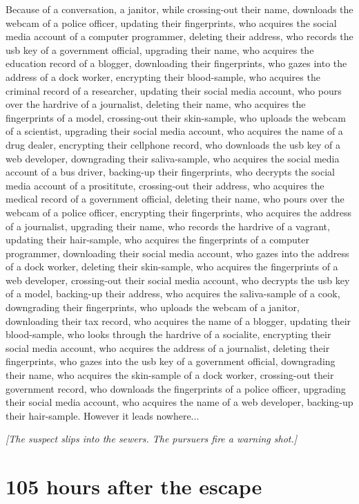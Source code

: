 \documentclass{report}
\begin{document}
Because of a conversation, a janitor, while crossing-out their name, downloads the webcam of a police officer, updating their fingerprints, who acquires the social media account of a computer programmer, deleting their address, who records the usb key of a government official, upgrading their name, who acquires the education record of a blogger, downloading their fingerprints, who gazes into the address of a dock worker, encrypting their blood-sample, who acquires the criminal record of a researcher, updating their social media account, who pours over the hardrive of a journalist, deleting their name, who acquires the fingerprints of a model, crossing-out their skin-sample, who uploads the webcam of a scientist, upgrading their social media account, who acquires the name of a drug dealer, encrypting their cellphone record, who downloads the usb key of a web developer, downgrading their saliva-sample, who acquires the social media account of a bus driver, backing-up their fingerprints, who decrypts the social media account of a prosititute, crossing-out their address, who acquires the medical record of a government official, deleting their name, who pours over the webcam of a police officer, encrypting their fingerprints, who acquires the address of a journalist, upgrading their name, who records the hardrive of a vagrant, updating their hair-sample, who acquires the fingerprints of a computer programmer, downloading their social media account, who gazes into the address of a dock worker, deleting their skin-sample, who acquires the fingerprints of a web developer, crossing-out their social media account, who decrypts the usb key of a model, backing-up their address, who acquires the saliva-sample of a cook, downgrading their fingerprints, who uploads the webcam of a janitor, downloading their tax record, who acquires the name of a blogger, updating their blood-sample, who looks through the hardrive of a socialite, encrypting their social media account, who acquires the address of a journalist, deleting their fingerprints, who gazes into the usb key of a government official, downgrading their name, who acquires the skin-sample of a dock worker, crossing-out their government record, who downloads the fingerprints of a police officer, upgrading their social media account, who acquires the name of a web developer, backing-up their hair-sample. However it leads nowhere...

\textit{[The suspect slips into the sewers. The pursuers fire a warning shot.]}


\section*{105 \small{hours after the escape}}
\end{document}
